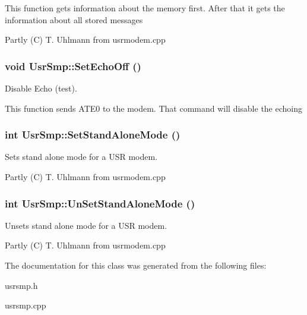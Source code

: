 This function gets information about the memory first. After that it gets the information about all stored messages

Partly (C) T. Uhlmann from usrmodem.cpp 
\subsubsection{\setlength{\rightskip}{0pt plus 5cm}void Usr\-Smp::Set\-Echo\-Off ()}\label{classUsrSmp_a2}


Disable Echo (test). 

This function sends ATE0 to the modem. That command will disable the echoing 
\subsubsection{\setlength{\rightskip}{0pt plus 5cm}int Usr\-Smp::Set\-Stand\-Alone\-Mode ()}\label{classUsrSmp_a4}


Sets stand alone mode for a USR modem. 

Partly (C) T. Uhlmann from usrmodem.cpp 
\subsubsection{\setlength{\rightskip}{0pt plus 5cm}int Usr\-Smp::Un\-Set\-Stand\-Alone\-Mode ()}\label{classUsrSmp_a5}


Unsets stand alone mode for a USR modem. 

Partly (C) T. Uhlmann from usrmodem.cpp 

The documentation for this class was generated from the following files:\begin{CompactItemize}
\item 
usrsmp.h\item 
usrsmp.cpp\end{CompactItemize}
